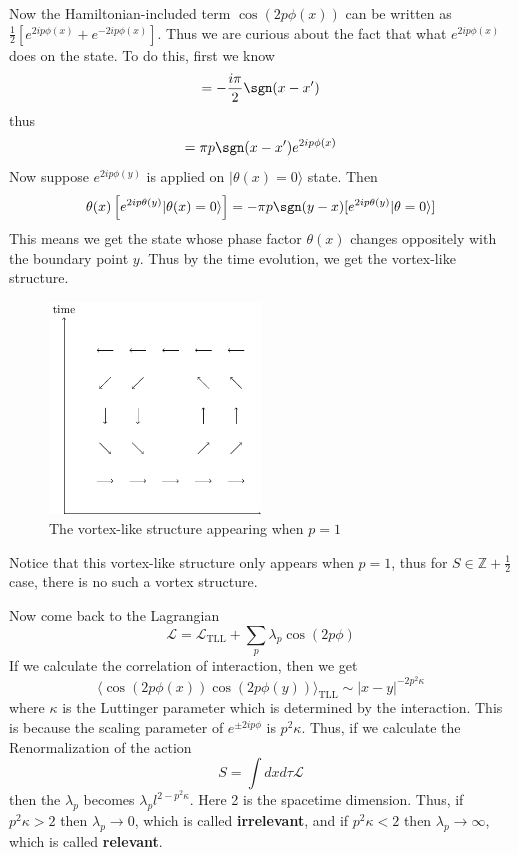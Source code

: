 Now the Hamiltonian-included term $\cos(2p\phi(x))$ can be written as $\frac{1}{2}\left[e^{2ip\phi(x)}+e^{-2ip\phi(x)}\right]$. Thus we are curious about the fact that what $e^{2ip\phi(x)}$ does on the state. To do this, first we know
\begin{equation}
[\phi(x),\theta(x')]=-\frac{i\pi}{2}\sgn(x-x')
\end{equation}
thus
\begin{equation}
[e^{2ip\phi(x)},\theta(x')]=\pi p\sgn(x-x')e^{2ip\phi(x)}
\end{equation}
Now suppose $e^{2ip\phi(y)}$ is applied on $|\theta(x)=0\rangle$ state. Then
\begin{equation}
\theta(x)\left[e^{2ip\theta(y)}|\theta(x)=0\rangle\right]=-\pi p \sgn(y-x)[e^{2ip\theta(y)}|\theta=0\rangle]
\end{equation}
This means we get the state whose phase factor $\theta(x)$ changes oppositely with the boundary point $y$. Thus by the time evolution, we get the vortex-like structure.
\begin{figure}[h!]
\center
\includegraphics[width=0.5\textwidth]{vortex.pdf}
\caption{The vortex-like structure appearing when $p=1$}
\end{figure}

Notice that this vortex-like structure only appears when $p=1$, thus for $S\in \mathbb{Z}+\frac{1}{2}$ case, there is no such a vortex structure.

Now come back to the Lagrangian
\begin{equation}
\mathcal{L}=\mathcal{L}_{\textrm{TLL}}+\sum_p \lambda_p\cos(2p\phi)
\end{equation}
If we calculate the correlation of interaction, then we get
\begin{equation}
\langle \cos(2p\phi(x))\cos(2p\phi(y))\rangle_{\textrm{TLL}}\sim |x-y|^{-2p^2\kappa}
\end{equation}
where $\kappa$ is the Luttinger parameter which is determined by the interaction. This is because the scaling parameter of $e^{\pm 2ip\phi}$ is $p^2\kappa$. Thus, if we calculate the Renormalization of the action
\begin{equation}
S=\int dxd\tau \mathcal{L}
\end{equation}
then the $\lambda_p$ becomes $\lambda_p l^{2-p^2\kappa}$. Here 2 is the spacetime dimension. Thus, if $p^2\kappa>2$ then $\lambda_p\rightarrow 0$, which is called \textbf{irrelevant}, and if $p^2\kappa<2$ then $\lambda_p\rightarrow \infty$, which is called \textbf{relevant}.

